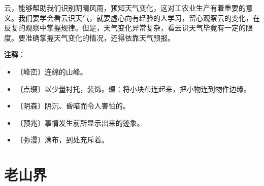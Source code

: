 \documentclass[12pt,UTF-8,openany]{ctexbook}
\begin{document}
\begin{normalsize}
    云，能够帮助我们识别阴晴风雨，预知天气变化，这对工农业生产有着重要的意义。我们要学会看云识天气，就要虚心向有经验的人学习，留心观察云的变化，在反复的观察中掌握规律。但是，天气变化异常复杂，看云识天气毕竟有一定的限度。要准确掌握天气变化的情况，还得依靠天气预报。
    
\end{normalsize}


\newpage

\textbf{注释}：

\vspace{-1em}

\begin{itemize}
    \setlength\itemsep{-0.2em}
    \item 〔峰峦〕连绵的山峰。
    \item 〔点缀〕以少量衬托，装饰。缀：将小块布连起来，把小物连到物件边缘。
    \item 〔阴森〕阴沉、昏暗而令人害怕的。
    \item 〔预兆〕事情发生前所显示出来的迹象。
    \item 〔弥漫〕满布，到处充斥着。
\end{itemize}

\chapter{老山界}
\end{document}
